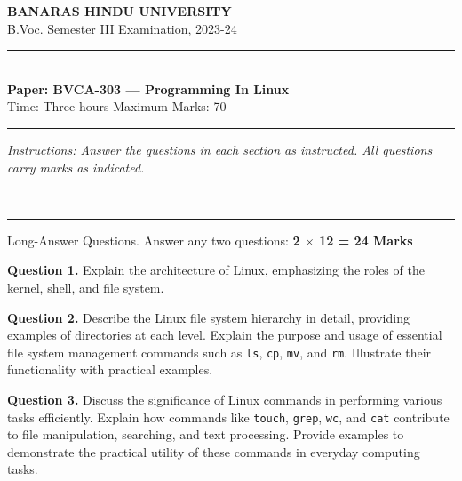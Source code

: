 \documentclass[11pt,a4paper]{article}
\begin{document}
\begin{center}
  {\large\bfseries BANARAS HINDU UNIVERSITY}\\[2pt]
  {\normalsize B.Voc. Semester III Examination, 2023-24}\\[6pt]
  \rule{0.8\linewidth}{0.5pt}\\[6pt]
  {\large\bfseries Paper: BVCA-303 --- Programming In Linux}\\[4pt]
  {\normalsize Time: Three hours \hfill Maximum Marks: 70}
\end{center}

\rule{\linewidth}{0.4pt}

\smallskip



\noindent   \textit{Instructions: Answer the questions in each section as instructed. All questions carry marks as indicated.}

\bigskip




\\[4pt]
\rule{\linewidth}{0.4pt}\smallskip

Long-Answer Questions. Answer any two questions: \hfill   \textbf{2 $ \times$ 12 = 24 Marks}

\medskip



\noindent   \textbf{Question 1.} Explain the architecture of Linux, emphasizing the roles of the kernel, shell, and file system.

\medskip



\noindent   \textbf{Question 2.} Describe the Linux file system hierarchy in detail, providing examples of directories at each level. Explain the purpose and usage of essential file system management commands such as   \texttt{ls},   \texttt{cp},   \texttt{mv}, and   \texttt{rm}. Illustrate their functionality with practical examples.

\medskip



\noindent   \textbf{Question 3.} Discuss the significance of Linux commands in performing various tasks efficiently. Explain how commands like   \texttt{touch},   \texttt{grep},   \texttt{wc}, and   \texttt{cat} contribute to file manipulation, searching, and text processing. Provide examples to demonstrate the practical utility of these commands in everyday computing tasks.

\medskip
\end{document}

